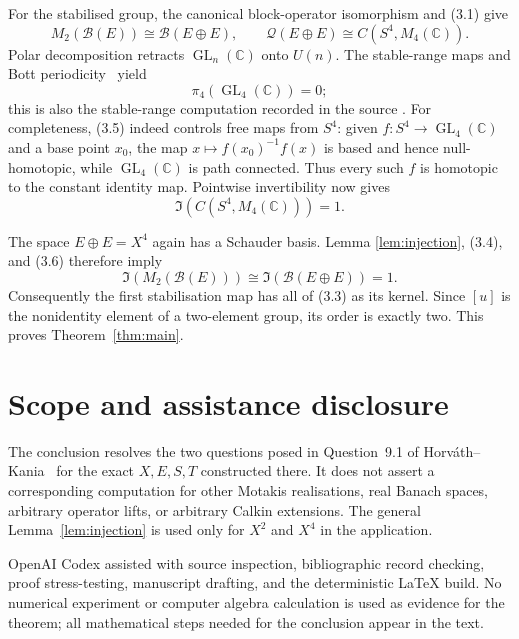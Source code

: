 \documentclass[11pt]{article}
\theoremstyle{remark}
\newcommand{\B}{\mathcal B}
\newcommand{\Q}{\mathcal Q}
\newcommand{\GL}{\operatorname{GL}}
\newcommand{\Id}{\mathfrak I}
\begin{document}
For the stabilised group, the canonical block-operator isomorphism and (3.1)
give
\[
 M_2(\B(E))\cong\B(E\oplus E),
 \qquad
 \Q(E\oplus E)\cong C(S^4,M_4(\mathbb C)).             \tag{3.4}
\]
Polar decomposition retracts $\GL_n(\mathbb C)$ onto $U(n)$.  The stable-range
maps and Bott periodicity~\cite{Bott1957} yield
\[
 \pi_4(\GL_4(\mathbb C))=0;                            \tag{3.5}
\]
this is also the stable-range computation recorded in the source
\cite[p.~2]{HorvathKania2026}.  For completeness, (3.5) indeed controls free
maps from $S^4$: given $f:S^4\to\GL_4(\mathbb C)$ and a base point $x_0$,
the map $x\mapsto f(x_0)^{-1}f(x)$ is based and hence null-homotopic, while
$\GL_4(\mathbb C)$ is path connected.  Thus every such $f$ is homotopic to the
constant identity map.  Pointwise invertibility now gives
\[
 \Id(C(S^4,M_4(\mathbb C)))=1.                         \tag{3.6}
\]

The space $E\oplus E=X^4$ again has a Schauder basis.  Lemma
\ref{lem:injection}, (3.4), and (3.6) therefore imply
\[
 \Id(M_2(\B(E)))\cong\Id(\B(E\oplus E))=1.             \tag{3.7}
\]
Consequently the first stabilisation map has all of (3.3) as its kernel.
Since $[u]$ is the nonidentity element of a two-element group, its order is
exactly two.  This proves Theorem~\ref{thm:main}.

\section*{Scope and assistance disclosure}

The conclusion resolves the two questions posed in Question~9.1 of
Horv\'ath--Kania~\cite{HorvathKania2026} for the exact $X,E,S,T$ constructed
there.  It does not assert a corresponding computation for other Motakis
realisations, real Banach spaces, arbitrary operator lifts, or arbitrary Calkin
extensions.  The general Lemma~\ref{lem:injection} is used only for $X^2$ and
$X^4$ in the application.

OpenAI Codex assisted with source inspection, bibliographic record checking,
proof stress-testing, manuscript drafting, and the deterministic LaTeX build.
No numerical experiment or computer algebra calculation is used as evidence
for the theorem; all mathematical steps needed for the conclusion appear in
the text.



\end{document}
